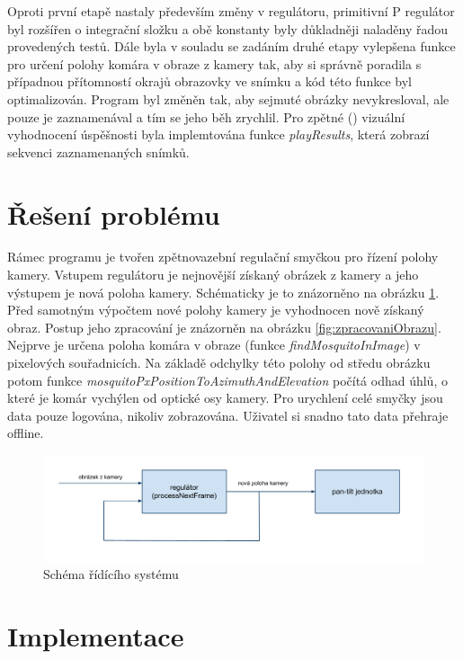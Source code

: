 \documentclass[a4paper,10pt]{article}
\begin{document}
		Oproti první etapě nastaly především změny v regulátoru, primitivní P regulátor
		byl rozšířen o integrační složku a obě konstanty byly důkladněji naladěny řadou
		provedených testů. Dále byla v souladu se zadáním druhé etapy vylepšena funkce
		pro určení polohy komára v obraze z kamery tak, aby si správně poradila s případnou
		přítomností okrajů obrazovky ve snímku a kód této funkce byl optimalizován.
		Program byl změněn tak, aby sejmuté obrázky nevykresloval,
		ale pouze je zaznamenával a tím se jeho běh zrychlil. Pro zpětné () vizuální 
		vyhodnocení úspěšnosti  byla implemtována funkce \textit{playResults},
		která zobrazí sekvenci zaznamenaných snímků.


\section{Řešení problému}

		Rámec programu je tvořen zpětnovazební regulační smyčkou pro řízení polohy
		kamery. Vstupem regulátoru je nejnovější získaný obrázek z kamery a jeho
		výstupem je nová poloha kamery. Schématicky je to znázorněno na obrázku
		\ref{fig:ridiciSystem}.  Před samotným výpočtem nové polohy kamery je vyhodnocen
		nově získaný obraz. Postup jeho zpracování je znázorněn na obrázku
		\ref{fig:zpracovaniObrazu}.  Nejprve je určena poloha komára v obraze (funkce
		\textit{findMosquitoInImage}) v pixelových souřadnicích. Na základě odchylky
		této polohy od středu obrázku potom funkce
		\textit{mosquitoPxPositionToAzimuthAndElevation} počítá odhad úhlů, o které je
		komár vychýlen od optické osy kamery. Pro urychlení celé smyčky jsou data pouze
		logována, nikoliv zobrazována. Uživatel si snadno tato data přehraje offline.

		\begin{figure}[!h]
			\centering
			 \includegraphics[width=1\columnwidth]{pics/schema_ridiciho_systemu}
			 \caption{Schéma řídícího systému}\label{fig:ridiciSystem}
		\end{figure}


\section{Implementace}
\end{document}
